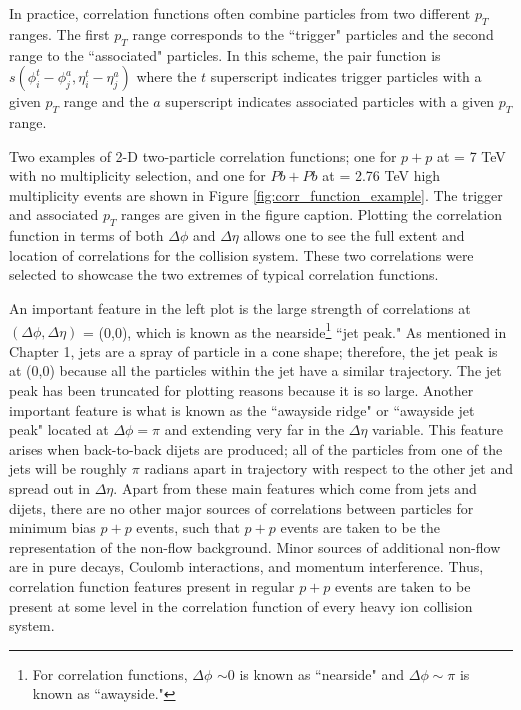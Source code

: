 In practice, correlation functions often combine particles from two different $p_T$ ranges. The first $p_T$ range corresponds to the ``trigger" particles and the second range to the ``associated" particles. In this scheme, the pair function is $s(\phi_i^t - \phi_j^a,\eta_i^t - \eta_j^a)$ where the $t$ superscript indicates trigger particles with a given $p_T$ range and the $a$ superscript indicates associated particles with a given $p_T$ range. 

Two examples of 2-D two-particle correlation functions; one for $p+p$ at \sqsn = 7 TeV with no multiplicity selection, and one for $Pb+Pb$ at \sqsn = 2.76 TeV high multiplicity events are shown in Figure \ref{fig:corr_function_example}. The trigger and associated $p_T$ ranges are given in the figure caption. Plotting the correlation function in terms of both $\Delta\phi$ and $\Delta\eta$ allows one to see the full extent and location of correlations for the collision system. These two correlations were selected to showcase the two extremes of typical correlation functions. 

An important feature in the left plot is the large strength of correlations at $(\Delta\phi,\Delta\eta)$ = (0,0), which is known as the nearside\footnote{For correlation functions, $\Delta\phi $ $\sim$0 is known as ``nearside" and $\Delta\phi  \sim\pi$ is known as ``awayside."} ``jet peak." As mentioned in Chapter 1, jets are a spray of particle in a cone shape; therefore, the jet peak is at (0,0) because all the particles within the jet have a similar trajectory. The jet peak has been truncated for plotting reasons because it is so large. Another important feature is what is known as the ``awayside ridge" or ``awayside jet peak" located at  $\Delta\phi = \pi$ and extending very far in the $\Delta\eta$ variable. This feature arises when back-to-back dijets are produced; all of the particles from one of the jets will be roughly $\pi$ radians apart in trajectory with respect to the other jet and spread out in $\Delta\eta$. Apart from these main features which come from jets and dijets, there are no other major sources of correlations between particles for minimum bias $p+p$ events, such that $p+p$ events are taken to be the representation of the non-flow background. Minor sources of additional non-flow are in pure decays, Coulomb interactions, and momentum interference. Thus, correlation function features present in regular $p+p$ events are taken to be present at some level in the correlation function of every heavy ion collision system.

